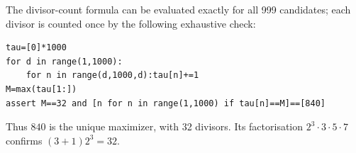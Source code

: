 The divisor-count formula can be evaluated exactly for all 999 candidates; each divisor is counted once by the following exhaustive check:
\begin{verbatim}
tau=[0]*1000
for d in range(1,1000):
    for n in range(d,1000,d):tau[n]+=1
M=max(tau[1:])
assert M==32 and [n for n in range(1,1000) if tau[n]==M]==[840]
\end{verbatim}
Thus $\boxed{840}$ is the unique maximizer, with 32 divisors. Its factorisation $ 2^3\cdot3\cdot5\cdot7 $ confirms $(3+1)2^3=32 $.
